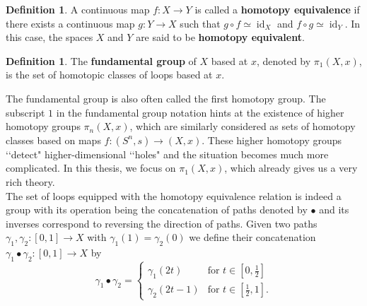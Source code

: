 \documentclass{article}
\theoremstyle{plain}
\theoremstyle{definition}
\newtheorem{definition}[theorem]{Definition}
\DeclareMathOperator{\id}{id}
\begin{document}
\begin{definition}
    A continuous map $f:X\rightarrow Y$ is called a \textbf{homotopy equivalence} if there exists a continuous map $g:Y\rightarrow X$ such that $g\circ f \simeq  \id_X$ and $f\circ g\simeq \id_Y$.  
    In this case, the spaces $X$ and $Y$ are said to be \textbf{homotopy equivalent}.
\end{definition}


\begin{definition}
    The \textbf{fundamental group} of $X$ based at $x$, denoted by $\pi_1(X,x)$, is the set of homotopic classes of loops based at $x$. 
\end{definition}

\noindent The fundamental group is also often called the first homotopy group. 
The subscript $1$ in the fundamental group notation hints at the existence of higher homotopy groups $\pi_n(X,x)$, which are similarly considered as sets of homotopy classes based on maps $f:(S^n,s)\rightarrow(X,x)$. 
These higher homotopy groups ‘‘detect" higher-dimensional ‘‘holes" and the situation becomes much more complicated. 
In this thesis, we focus on $\pi_1(X,x)$, which already gives us a very rich theory.\\

\noindent The set of loops equipped with the homotopy equivalence relation is indeed a group with its operation being the concatenation of paths denoted by $\bullet$ and its inverses correspond to reversing the direction of paths. Given two paths $\gamma_1,\gamma_2 : [0,1] \rightarrow X$ with $\gamma_1(1) = \gamma_2(0)$ we define their concatenation $\gamma_1\bullet\gamma_2 : [0,1]\rightarrow X$ by 
\begin{equation*}
  \gamma_1\bullet\gamma_2 =
    \begin{cases}
      \gamma_1(2t) & \text{for $t\in [0,\frac{1}{2}]$}\\
      \gamma_2(2t-1) & \text{for $t\in [\frac{1}{2}, 1]$}.
    \end{cases}       
\end{equation*}
\end{document}
